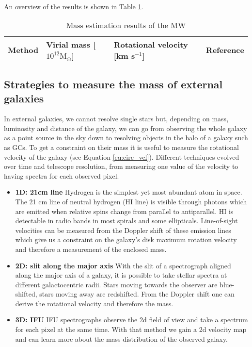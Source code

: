 An overview of the results is shown in Table \ref{tab:MW_mass_estimations}.
\begin{table}[htbp]
\captionsetup{format=plain}
    \centering
    \begin{tabular}{@{}llll@{}}
         \toprule
         Method& Virial mass [$10^{12} \mathrm{M}_\odot$] & Rotational velocity [km s$^{-1}$]&Reference  \\
         
         \midrule

         \bottomrule 
    \end{tabular}
    \caption{Mass estimation results of the \ac{MW} }
    \label{tab:MW_mass_estimations}
\end{table}


\subsection{Strategies to measure the mass of external galaxies}\label{subsec:mass_est_ext}
In external galaxies, we cannot resolve single stars but, depending on mass, luminosity and distance of the galaxy, we can go from observing the whole galaxy as a point source in the sky down to resolving objects in the halo of a galaxy such as \acp{GC}. To get a constraint on their mass it is useful to measure the rotational velocity of the galaxy (see Equation \ref{eq:circ_vel}). Different techniques evolved over time and telescope resolution, from measuring one value of the velocity to having spectra for each observed pixel.
\begin{itemize}
    \item\textbf{1D: 21cm line} Hydrogen is the simplest yet most abundant atom in space. The 21 cm line of neutral hydrogen (HI line) is visible through photons which are emitted when relative spins change from parallel to antiparallel. HI is detectable in radio bands in most spirals and some ellipticals. Line-of-sight velocities can be measured from the Doppler shift of these emission lines which give us a constraint on the galaxy's disk maximum rotation velocity and therefore a measurement of the enclosed mass.
    \item\textbf{2D: slit along the major axis} With the slit of a spectrograph aligned along the major axis of a galaxy, it is possible to take stellar spectra at different galactocentric radii. Stars moving towards the observer are blue-shifted, stars moving away are redshifted. From the Doppler shift one can derive the rotational velocity and therefore the mass.
    \item \textbf{3D: \acl{IFU}} \ac{IFU} spectrographs observe the 2d field of view and take a spectrum for each pixel at the same time. With that method we gain a 2d velocity map and can learn more about the mass distribution of the observed galaxy.
\end{itemize}

